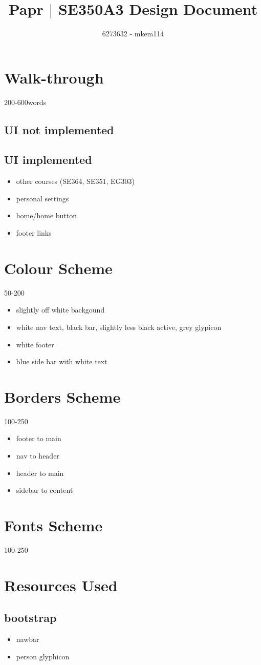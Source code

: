 \documentclass[10pt,a4paper]{article}
\author{6273632 - mkem114}
\title{Papr $|$ SE350A3 Design Document}
\begin{document}
\maketitle
\section{Walk-through}
200-600words
\subsection{UI not implemented}
\subsection{UI implemented}
\begin{itemize}
	\item other courses (SE364, SE351, EG303)
	\item personal settings
	\item home/home button
	\item footer links
\end{itemize}
\section{Colour Scheme}
50-200
\begin{itemize}
	\item slightly off white backgound
	\item white nav text, black bar, slightly less black active, grey glypicon
	\item white footer
	\item blue side bar with white text
\end{itemize}
\section{Borders Scheme}
100-250
\begin{itemize}
	\item footer to main
	\item nav to header
	\item header to main
	\item sidebar to content
\end{itemize}
\section{Fonts Scheme}
100-250
\section{Resources Used}
\subsection{bootstrap}
\begin{itemize}
	\item nawbar
	\item person glyphicon
\end{itemize}
\end{document}
